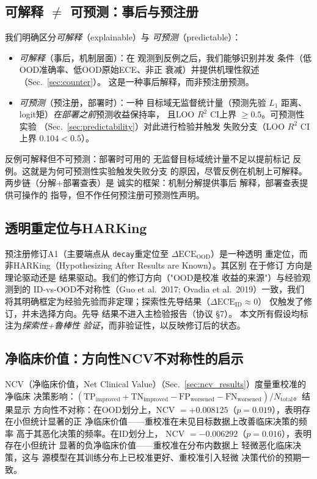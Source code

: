 \subsection{可解释 $\neq$ 可预测：事后与预注册}
我们明确区分\emph{可解释}（explainable）与
\emph{可预测}（predictable）：
\begin{itemize}
    \item \emph{可解释}（事后，机制层面）：在
    观测到反例之后，我们能够识别并发
    条件（低OOD准确率、低OOD原始ECE、非正
    衰减）并提供机理性叙述（Sec.~\ref{sec:counter}）。
    这是一种事后解释，而非预注册预测。
    \item \emph{可预测}（预注册，部署时）：一种
    目标域无监督统计量（预测先验 $L_1$
    距离、logit矩）\emph{在部署之前}预测收益保持率，
    且LOO $R^2$ CI上界
    $\geq 0.5$。可预测性实验
    （Sec.~\ref{sec:predictability}）对此进行检验并触发
    失败分支（LOO $R^2$ CI上界 $0.104<0.5$）。
\end{itemize}
反例可解释但不可预测：部署时可用的
无监督目标域统计量不足以提前标记
反例。这就是为何可预测性实验触发失败分支
的原因，尽管反例在机制上可解释。
两步链（分解+部署查表）是
诚实的框架：机制分解提供事后
解释，部署查表提供可操作的
指导，但不作任何预注册可预测性声明。

\subsection{透明重定位与HARKing}
预注册修订A1（主要端点从
\texttt{decay}重定位至 $\Delta\text{ECE}_{\text{OOD}}$）是一种透明
重定位，而非HARKing（Hypothesizing After Results are Known）。其区别
\cite{lakens2019prereg,nosek2019prereg}在于修订
方向是理论驱动还是
结果驱动。我们的修订方向（"OOD是校准
收益的来源"）与经验观测到的
ID-vs-OOD不对称性（Guo et al.\ 2017; Ovadia et al.\ 2019）一致，我们
将其明确框定为经验先验而非定理；探索性先导结果（$\Delta\text{ECE}_{\text{ID}}\approx 0$）
仅触发了修订，并未选择方向。先导
结果不进入主检验报告（协议 \S7）。
本文所有假设均标注为\emph{探索性+鲁棒性
验证}，而非验证性，以反映修订后的状态。

\subsection{净临床价值：方向性NCV不对称性的启示}
\label{sec:ncv_discussion}
NCV（净临床价值，Net Clinical Value）（Sec.~\ref{sec:ncv_results}）度量重校准的净临床
决策影响：$(\text{TP}_{\text{improved}} +
\text{TN}_{\text{improved}} - \text{FP}_{\text{worsened}} -
\text{FN}_{\text{worsened}}) / N_{\text{total}}$。结果显示
方向性不对称：在OOD划分上，NCV $= +0.008125$（$p =
0.019$），表明存在小但统计显著的正
净临床价值——重校准在未见目标数据上改善临床决策的频率
高于其恶化决策的频率。在ID划分上，
NCV $= -0.006292$（$p = 0.016$），表明存在小但统计
显著的负净临床价值——重校准在分布内数据上
轻微恶化临床决策，这与
源模型在其训练分布上已校准更好、重校准引入轻微
决策代价的预期一致。

